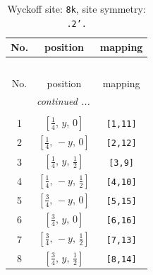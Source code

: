 \documentclass[fleqn,8pt]{jsarticle}
\begin{document}
\begin{longtable}{ccc}
\caption{Wyckoff site: {\tt 8k}, site symmetry: {\tt .2'.}}
 \\
 \hline \hline
No. & position & mapping \\ \hline \endfirsthead

\multicolumn{2}{l}{\tablename\ \thetable{}} \\
 \hline \hline
No. & position & mapping \\ \hline \endhead

 \hline \hline
\multicolumn{2}{r}{\footnotesize\it continued ...} \\ \endfoot

 \hline \hline
\multicolumn{2}{r}{} \\ \endlastfoot

1 & $\left[ \frac{1}{4},\, y,\, 0 \right]$ & {\tt [1,11]} \\ \hline
2 & $\left[ \frac{1}{4},\, - y,\, 0 \right]$ & {\tt [2,12]} \\ \hline
3 & $\left[ \frac{1}{4},\, y,\, \frac{1}{2} \right]$ & {\tt [3,9]} \\ \hline
4 & $\left[ \frac{1}{4},\, - y,\, \frac{1}{2} \right]$ & {\tt [4,10]} \\ \hline
5 & $\left[ \frac{3}{4},\, - y,\, 0 \right]$ & {\tt [5,15]} \\ \hline
6 & $\left[ \frac{3}{4},\, y,\, 0 \right]$ & {\tt [6,16]} \\ \hline
7 & $\left[ \frac{3}{4},\, - y,\, \frac{1}{2} \right]$ & {\tt [7,13]} \\ \hline
8 & $\left[ \frac{3}{4},\, y,\, \frac{1}{2} \right]$ & {\tt [8,14]} \\
\end{longtable}
\renewcommand{\arraystretch}{1.2}
\end{document}

